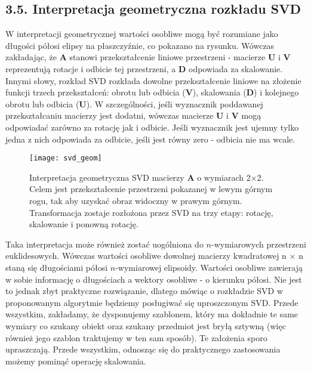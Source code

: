 \documentclass{article}
\begin{document}
\subsection*{\Large{3.5. Interpretacja geometryczna rozkładu SVD}} 

W interpretacji geometrycznej wartości osobliwe mogą być rozumiane jako długości półosi elipsy na płaszczyźnie, co pokazano na rysunku. Wówczas zakładając, że $\mathbf{A}$ stanowi przekształcenie liniowe przestrzeni - macierze $\mathbf{U}$ i $\mathbf{V}$ reprezentują rotacje i odbicie tej przestrzeni, a $\mathbf{D}$ odpowiada za skalowanie. Innymi słowy, rozkład SVD rozkłada dowolne przekształcenie liniowe na złożenie funkcji trzech przekształceń: obrotu lub odbicia ($\mathbf{V}$), skalowania ($\mathbf{D}$) i kolejnego obrotu lub odbicia ($\mathbf{U}$). W szczególności, jeśli wyznacznik poddawanej przekształcaniu macierzy jest dodatni, wówczas macierze $\mathbf{U}$ i $\mathbf{V}$ mogą odpowiadać zarówno za rotację jak i odbicie. Jeśli wyznacznik jest ujemny tylko jedna z nich odpowiada za odbicie, jeśli jest równy zero - odbicia nie ma wcale.

\begin{figure}[h]
\centering
\texttt{[image: svd\_geom]}
\caption{Interpretacja geometryczna SVD macierzy $\mathbf{A}$ o wymiarach 2$\times$2. Celem jest przekształcenie przestrzeni pokazanej w lewym górnym rogu, tak aby uzyskać obraz widoczny w prawym górnym. Transformacja zostaje rozłożona przez SVD na trzy etapy: rotację, skalowanie i ponowną rotację.}
\end{figure}

Taka interpretacja może również zostać uogólniona do $n$-wymiarowych przestrzeni euklidesowych. Wówczas wartości osobliwe dowolnej macierzy kwadratowej n $\times$ n staną się długościami półosi $n$-wymiarowej elipsoidy. Wartości osobliwe zawierają w sobie informację o długościach a wektory osobliwe - o kierunku półosi. Nie jest to jednak zbyt praktyczne rozwiązanie, dlatego mówiąc o rozkładzie SVD w proponowanym algorytmie będziemy posługiwać się uproszczonym SVD. Przede wszystkim, zakładamy, że dysponujemy szablonem, który ma dokładnie te same wymiary co szukany obiekt oraz szukany przedmiot jest bryłą sztywną (więc również jego szablon traktujemy w ten sam sposób). Te założenia sporo upraszczają. Przede wszystkim, odnosząc się do praktycznego zastosowania możemy pominąć operację skalowania.

\newpage
\end{document}
